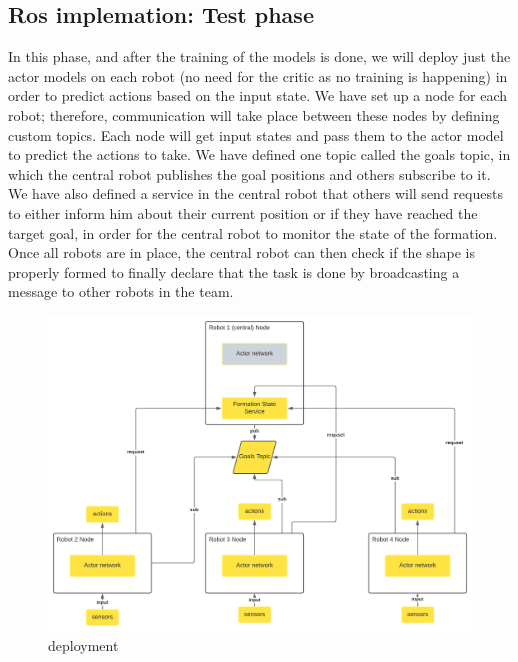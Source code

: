 \documentclass[12pt]{extarticle}
\begin{document}
\pagebreak
\subsection{Ros implemation: Test phase}
In this phase, and after the training of the models is done, we will deploy just the actor models on each robot (no need for the critic as no training is happening) in order to predict actions based on the input state.
We have set up a node for each robot; therefore, communication will take place between these nodes by defining custom topics. Each node will get input states and pass them to the actor model to predict the actions to take.
We have defined one topic called the goals topic, in which the central robot publishes the goal positions and others subscribe to it.  We have also defined a service in the central robot that others will send requests to either inform him about their current position or if they have reached the target goal, in order for the central robot to monitor the state of the formation.
Once all robots are in place, the central robot can then check if the shape is properly formed to finally declare that the task is done by broadcasting a message to other robots in the team.
  



 \begin{figure}[h]  
\centering
\includegraphics[scale=1.2]{deployment}
\caption[deployment]{deployment}
\end{figure}
\end{document}
